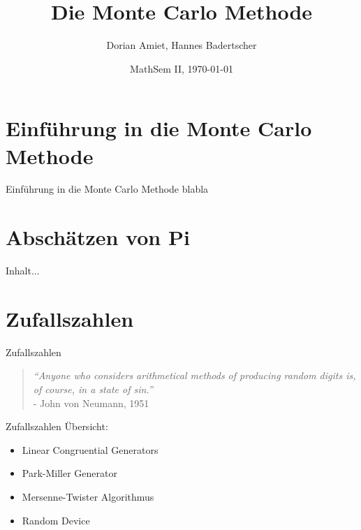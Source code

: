 \documentclass{beamer}
\title{Die Monte Carlo Methode}
\author[Amiet, Badertscher]{Dorian Amiet, Hannes Badertscher}
\date [MathSem II, FS14]{MathSem II, \today}
\begin{document}
\begin{frame}
	\titlepage
\end{frame}
	
\section[Einführung]{Einführung in die Monte Carlo Methode}
\begin{frame}{Einführung in die Monte Carlo Methode}
	blabla
\end{frame}

\section{Abschätzen von Pi}
\begin{frame}
Inhalt...
\end{frame}

\section{Zufallszahlen}
\begin{frame}{Zufallszahlen}
	\begin{quote}
	\textit{“Anyone who considers arithmetical methods of producing random digits is, of course, in a state of sin.”} \\ - John von Neumann, 1951
	\end{quote}
\end{frame}
\begin{frame}{Zufallszahlen}
	Übersicht:
	\begin{itemize}
		\item<1-> Linear Congruential Generators
		\item<1-> Park-Miller Generator
		\item<1-> Mersenne-Twister Algorithmus
		\item<1-> Random Device
	\end{itemize}
\end{frame}
\end{document}
